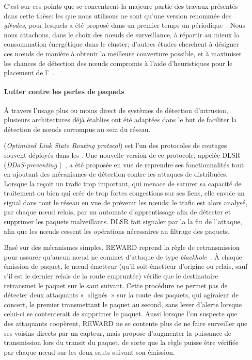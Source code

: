 C'est sur ces points que se concentrent la majeure partie des travaux présentés dans cette thèse: les \cns que nous utilisons ne sont qu'une version renommée des \textit{gNodes}, pour lesquels a été proposé dans un premier temps un  périodique~\cite{GMT12}.
Nous nous attachons, dans le choix des nœuds de surveillance, à répartir au mieux la consommation énergétique dans le cluster; d'autres études cherchent à désigner ces nœuds de manière à obtenir la meilleure couverture possible, et à maximiser les chances de détection des nœuds compromis à l'aide d'heuristiques pour le placement de l'\IDS~\cite{INK09}.

        \paragraph{Lutter contre les pertes de paquets}
À travers l'usage plus ou moins direct de systèmes de détection d'intrusion, plusieurs architectures déjà établies ont été adaptées dans le but de faciliter la détection de nœuds corrompus au sein du réseau.

\olsr (\textit{Optimized Link State Routing protocol}) est l'un des protocoles de routages souvent déployés dans les \rcs.
Une nouvelle version de ce protocole, appelée DLSR (\textit{DDoS-preventing \olsr})~\cite{MKASF10}, a été proposée en vue de reprendre ses fonctionnalités tout en ajoutant des mécanismes de détection contre les attaques de \dds distribuées.
Lorsque la \sdb reçoit un trafic trop important, qui menace de saturer sa capacité de traitement ou bien qui crée de trop fortes congestions sur ses liens, elle envoie un signal dans tout le réseau en vue de prévenir les nœuds; le trafic est alors analysé, par chaque nœud relais, par un automate d'apprentissage afin de détecter et supprimer les paquets malveillants.
DLSR fait signaler par la \sdb la fin de l'attaque, afin que les nœuds cessent les opérations nécessaires au filtrage des paquets.

Basé sur des mécanismes simples, REWARD reprend la règle de retransmission pour assurer qu'aucun nœud ne commet d'attaque de type \textit{blackhole}~\cite{Kar05}.
À chaque émission de paquet, le nœud émetteur (qu'il soit émetteur d'origine ou relais, sauf s'il est le dernier relais de la route empruntée) vérifie que le destinataire retransmet le paquet sur le saut suivant.
Cette procédure ne permet pas de détecter deux attaquants « alignés » sur la route des paquets, qui agiraient de concert, le premier transmettant le paquet au second, sans lever d'alerte lorsque celui-ci se contenterait de supprimer le paquet.
Aussi lorsque l'on suspecte que des attaquants coopèrent, REWARD ne se contente plus de ne faire surveiller que ses voisins directs par un capteur, mais propose d'augmenter la puissance de transmission lors du transit du paquet, de sorte que la règle puisse être vérifiée par chaque nœud sur les deux sauts suivant son émission.


